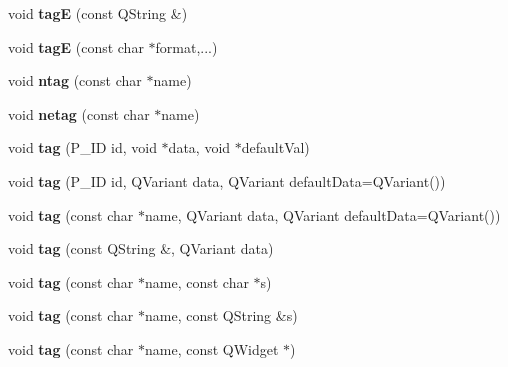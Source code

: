 \begin{DoxyCompactItemize}
void {\bfseries tagE} (const Q\+String \&)
\item 
\mbox{\label{class_ms_1_1_xml_writer_afed2aa3b240cfdc461ec2181bd0533e4}} 
void {\bfseries tagE} (const char $\ast$format,...)
\item 
\mbox{\label{class_ms_1_1_xml_writer_ab186b744386262c7312d662c010ce188}} 
void {\bfseries ntag} (const char $\ast$name)
\item 
\mbox{\label{class_ms_1_1_xml_writer_aa88bb0b31eda2948dbc69ad87246eaa4}} 
void {\bfseries netag} (const char $\ast$name)
\item 
\mbox{\label{class_ms_1_1_xml_writer_a4a2596c158bb3430189aa3a287bd4971}} 
void {\bfseries tag} (P\+\_\+\+ID id, void $\ast$data, void $\ast$default\+Val)
\item 
\mbox{\label{class_ms_1_1_xml_writer_afdacfcaa123d8972d0ee39a8f3624db1}} 
void {\bfseries tag} (P\+\_\+\+ID id, Q\+Variant data, Q\+Variant default\+Data=Q\+Variant())
\item 
\mbox{\label{class_ms_1_1_xml_writer_a26f93b1b2ef2da30015917767f716a09}} 
void {\bfseries tag} (const char $\ast$name, Q\+Variant data, Q\+Variant default\+Data=Q\+Variant())
\item 
\mbox{\label{class_ms_1_1_xml_writer_a554858cc813cf53774fd4b482dffb4bc}} 
void {\bfseries tag} (const Q\+String \&, Q\+Variant data)
\item 
\mbox{\label{class_ms_1_1_xml_writer_ab47fc9ec182e58e0aa22c997e55697a9}} 
void {\bfseries tag} (const char $\ast$name, const char $\ast$s)
\item 
\mbox{\label{class_ms_1_1_xml_writer_a3adbaf69eba62ae7303213db518d65f3}} 
void {\bfseries tag} (const char $\ast$name, const Q\+String \&s)
\item 
\mbox{\label{class_ms_1_1_xml_writer_a9770a013e3343eb09c123632f7b7144e}} 
void {\bfseries tag} (const char $\ast$name, const Q\+Widget $\ast$)

\end{DoxyCompactItemize}
